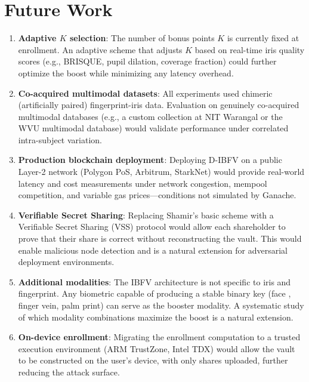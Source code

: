 \section{Future Work}
\label{sec:future_work}

\begin{enumerate}
  \item \textbf{Adaptive $K$ selection}: The number of bonus points $K$ is
  currently fixed at enrollment. An adaptive scheme that adjusts $K$ based on
  real-time iris quality scores (e.g., BRISQUE, pupil dilation, coverage fraction)
  could further optimize the boost while minimizing any latency overhead.

  \item \textbf{Co-acquired multimodal datasets}: All experiments used chimeric
  (artificially paired) fingerprint-iris data. Evaluation on genuinely co-acquired
  multimodal databases (e.g., a custom collection at NIT Warangal or the
  WVU multimodal database) would validate performance under correlated intra-subject
  variation.

  \item \textbf{Production blockchain deployment}: Deploying D-IBFV on a public
  Layer-2 network (Polygon PoS, Arbitrum, StarkNet) would provide real-world
  latency and cost measurements under network congestion, mempool competition,
  and variable gas prices---conditions not simulated by Ganache.

  \item \textbf{Verifiable Secret Sharing}: Replacing Shamir's basic scheme with
  a Verifiable Secret Sharing (VSS) protocol \cite{pedersen1991non} would allow
  each shareholder to prove that their share is correct without reconstructing
  the vault. This would enable malicious node detection and is a natural
  extension for adversarial deployment environments.

  \item \textbf{Additional modalities}: The IBFV architecture is not specific to
  iris and fingerprint. Any biometric capable of producing a stable binary key
  (face \cite{hao2006combining}, finger vein, palm print) can serve as the booster
  modality. A systematic study of which modality combinations maximize the boost
  is a natural extension.

  \item \textbf{On-device enrollment}: Migrating the enrollment computation to a
  trusted execution environment (ARM TrustZone, Intel TDX) would allow the vault
  to be constructed on the user's device, with only shares uploaded, further
  reducing the attack surface.
\end{enumerate}


